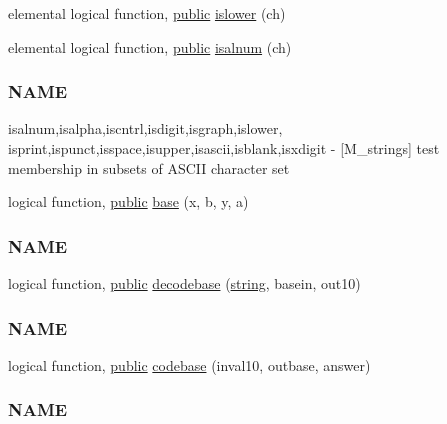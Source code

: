 \begin{DoxyCompactItemize}
\item 
elemental logical function, \hyperlink{M__stopwatch_83_8txt_a2f74811300c361e53b430611a7d1769f}{public} \hyperlink{namespacem__strings_a9de5290748f02f575f3b7b859ff074ed}{islower} (ch)
\item 
elemental logical function, \hyperlink{M__stopwatch_83_8txt_a2f74811300c361e53b430611a7d1769f}{public} \hyperlink{namespacem__strings_ad8fd9bbf618bdba2c3ac9fb3c8174362}{isalnum} (ch)
\begin{DoxyCompactList}\small\item\em \subsubsection*{N\+A\+ME}

isalnum,isalpha,iscntrl,isdigit,isgraph,islower, isprint,ispunct,isspace,isupper,isascii,isblank,isxdigit -\/ \mbox{[}M\+\_\+strings\mbox{]} test membership in subsets of A\+S\+C\+II character set \end{DoxyCompactList}\item 
logical function, \hyperlink{M__stopwatch_83_8txt_a2f74811300c361e53b430611a7d1769f}{public} \hyperlink{namespacem__strings_a635ef6f1dd73400e7b339392886d6357}{base} (x, b, y, a)
\begin{DoxyCompactList}\small\item\em \subsubsection*{N\+A\+ME}\end{DoxyCompactList}\item 
logical function, \hyperlink{M__stopwatch_83_8txt_a2f74811300c361e53b430611a7d1769f}{public} \hyperlink{namespacem__strings_a90f3bdfa02c8ddff42cb15e66b124fe8}{decodebase} (\hyperlink{what__overview_81_8txt_a74cb7e955273b9f9157b4f0c18a38849}{string}, basein, out10)
\begin{DoxyCompactList}\small\item\em \subsubsection*{N\+A\+ME}\end{DoxyCompactList}\item 
logical function, \hyperlink{M__stopwatch_83_8txt_a2f74811300c361e53b430611a7d1769f}{public} \hyperlink{namespacem__strings_a3a022b64dc902dc6043e3f265ee78e38}{codebase} (inval10, outbase, answer)
\begin{DoxyCompactList}\small\item\em \subsubsection*{N\+A\+ME}\end{DoxyCompactList}\end{DoxyCompactItemize}
